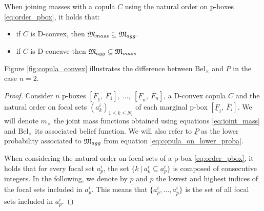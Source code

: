 \begin{proposition}\label{prop:convexity_pbox}
    When joining masses with a copula $C$ using the natural order on p-boxes \eqref{eq:order_pbox}, it holds that:
    \begin{itemize}
        \item if $C$ is D-convex, then ${\mathfrak{M}}_{mass}\subseteq {\mathfrak{M}}_{agg}$.
        \item if $C$ is D-concave then ${\mathfrak{M}}_{agg}\subseteq{\mathfrak{M}}_{mass}$ 
    \end{itemize}
\end{proposition}
Figure \ref{fig:copula_convex} illustrates the difference between $\mathrm{Bel}_\times$ and $\underline{P}$ in the case $n=2$.
\begin{proof}
    Consider $n$ p-boxes $[\underline{F}_1,~\overline{F}_1],~\dots,~[\underline{F}_n,~\overline{F}_n]$, a D-convex copula $C$ and the natural order on focal sets $(a^i_k)_{1\leqslant k \leqslant N_i}$ of each marginal p-box $[\underline{F}_i,~\overline{F}_i]$. We will denote $m_\times$ the joint mass functions obtained using equations \eqref{eq:joint_mass} and $\mathrm{Bel}_\times$ its associated belief function. We will also refer to $\underline{P}$ as the lower probability associated to ${\mathfrak{M}}_{agg}$ from equation \eqref{eq:copula_on_lower_proba}.

    When considering the natural order on focal sets of a p-box \eqref{eq:order_pbox}, it holds that for every focal set $a^i_p$, the set $\{k~|~a^i_k\subseteq a^i_p\}$ is composed of consecutive integers. In the following, we denote by $\underline{p}$ and $\overline{p}$ the lowest and highest indices of the focal sets included in $a^i_p$. This means that $\{a^i_{\underline{p}}, \dots, a^i_{\overline{p}}\}$ is the set of all focal sets included in $a^i_p$. 


\end{proof}
